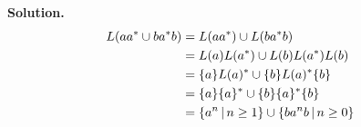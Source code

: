 \textbf{Solution.}
\begin{align*}
 L(aa^* \cup ba^*b)
  &= L(aa^*) \cup L(ba^*b) \cr
  &= L(a)L(a^*) \cup L(b)L(a^*)L(b) \cr
  &= \{a\}L(a)^* \cup \{b\}L(a)^*\{b\} \cr
  &= \{a\}\{a\}^* \cup \{b\}\{a\}^*\{b\} \cr
  &= \{ a^n \,|\, n \geq 1 \} \cup \{ ba^nb \,|\, n \geq 0 \}
 \end{align*}

